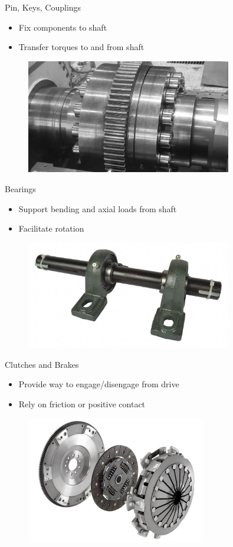 \documentclass[
svgnames,
handout,
10pt,
]{beamer}
\begin{document}
\begin{frame}{Pin, Keys, Couplings}
  \begin{itemize}
    \item Fix components to shaft
    \item Transfer torques to and from shaft
  \end{itemize}
  \begin{figure}[htbp]
    \centering
    \includegraphics[width=0.8\textwidth]{turbine-coupling-bolts}
  \end{figure}
\end{frame}

\begin{frame}{Bearings}
  \begin{itemize}
    \item Support bending and axial loads from shaft
    \item Facilitate rotation
  \end{itemize}
  \begin{figure}[htbp]
    \centering
    \includegraphics[width=0.8\textwidth]{bearings}
  \end{figure}
\end{frame}

\begin{frame}{Clutches and Brakes}
  \begin{itemize}
    \item Provide way to engage/disengage from drive
    \item Rely on friction or positive contact
  \end{itemize}
  \begin{figure}[htbp]
    \centering
    \includegraphics[width=0.7\textwidth]{clutch}
  \end{figure}
\end{frame}
\end{document}

